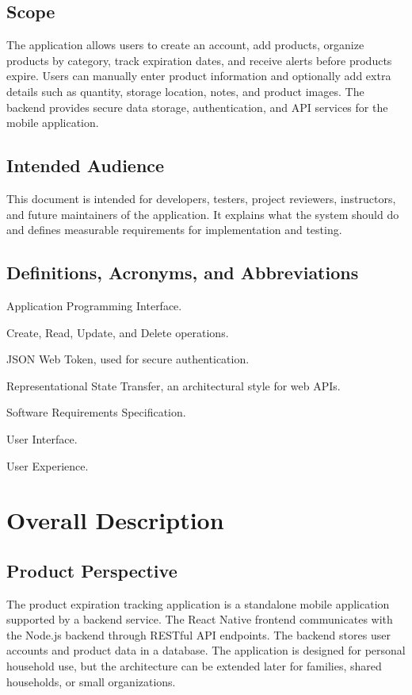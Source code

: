 \documentclass[12pt]{article}
\begin{document}
\subsection{Scope}
The application allows users to create an account, add products, organize products by category, track expiration dates, and receive alerts before products expire. Users can manually enter product information and optionally add extra details such as quantity, storage location, notes, and product images. The backend provides secure data storage, authentication, and API services for the mobile application.

\subsection{Intended Audience}
This document is intended for developers, testers, project reviewers, instructors, and future maintainers of the application. It explains what the system should do and defines measurable requirements for implementation and testing.

\subsection{Definitions, Acronyms, and Abbreviations}
\begin{description}[leftmargin=2.5cm]
    \item[API] Application Programming Interface.
    \item[CRUD] Create, Read, Update, and Delete operations.
    \item[JWT] JSON Web Token, used for secure authentication.
    \item[REST] Representational State Transfer, an architectural style for web APIs.
    \item[SRS] Software Requirements Specification.
    \item[UI] User Interface.
    \item[UX] User Experience.
\end{description}

\section{Overall Description}

\subsection{Product Perspective}
The product expiration tracking application is a standalone mobile application supported by a backend service. The React Native frontend communicates with the Node.js backend through RESTful API endpoints. The backend stores user accounts and product data in a database. The application is designed for personal household use, but the architecture can be extended later for families, shared households, or small organizations.
\end{document}
